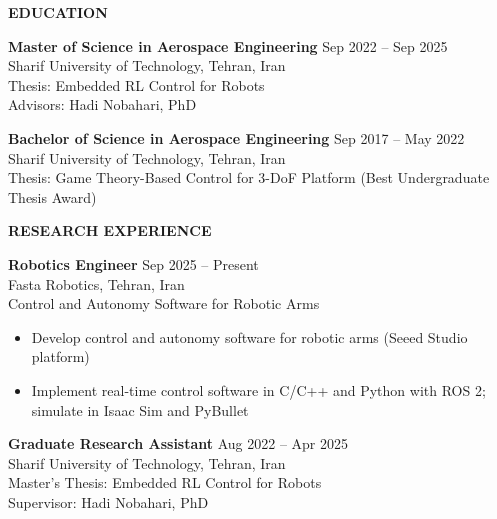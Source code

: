 \documentclass[12pt]{article}
\begin{document}
\vspace{8pt}

\begin{center}
	{\noindent \bfseries EDUCATION}
\end{center}

\vspace{-4pt}

\noindent
\textbf{Master of Science in Aerospace Engineering} \hfill Sep 2022 -- Sep 2025 \\
Sharif University of Technology, Tehran, Iran \\
Thesis: Embedded RL Control for Robots \\
Advisors: Hadi Nobahari, PhD

\vspace{4pt}

\noindent
\textbf{Bachelor of Science in Aerospace Engineering} \hfill Sep 2017 -- May 2022 \\
Sharif University of Technology, Tehran, Iran \\
Thesis: Game Theory-Based Control for 3-DoF Platform (Best Undergraduate Thesis Award)

\vspace{8pt}

\begin{center}
	{\noindent \bfseries RESEARCH EXPERIENCE}
\end{center}

\vspace{-4pt}

\noindent
\textbf{Robotics Engineer} \hfill Sep 2025 -- Present \\
Fasta Robotics, Tehran, Iran \\
Control and Autonomy Software for Robotic Arms

\begin{itemize} \itemsep 1pt
	\item Develop control and autonomy software for robotic arms (Seeed Studio platform)
	\item Implement real-time control software in C/C++ and Python with ROS 2; simulate in Isaac Sim and PyBullet
\end{itemize}

\vspace{4pt}

\noindent
\textbf{Graduate Research Assistant} \hfill Aug 2022 -- Apr 2025 \\
Sharif University of Technology, Tehran, Iran \\
Master's Thesis: Embedded RL Control for Robots \\
Supervisor: Hadi Nobahari, PhD
\end{document}
